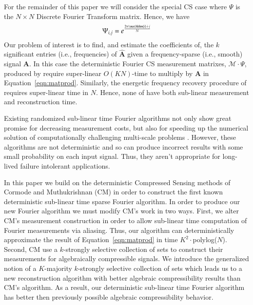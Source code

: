 \documentclass{article}
\begin{document}
For the remainder of this paper we will consider the special CS case where $\Psi$ is the $N \times N$ Discrete Fourier Transform matrix.  Hence, we have
\begin{equation}
\Psi_{i,j} = e^{\frac{2 \pi \mathbbm{i} \cdot i \cdot j}{N}}
\end{equation}
Our problem of interest is to find, and estimate the coefficients of, the $k$ significant entries (i.e., frequencies) of $\hat{\textbf{A}}$ given a frequency-sparse (i.e., smooth) signal \textbf{A}.  In this case the deterministic Fourier CS measurement matrixes, $\mathcal{M} \cdot \Psi$, produced by \cite{CS2,CMDetCS3,CMDetCS1,CMDetCS2} require super-linear $O(K N)$-time to multiply by \textbf{A} in Equation~\ref{eqn:matprod}.  Similarly, the energetic frequency recovery procedure of \cite{CS1,DetCS} requires super-linear time in $N$.  Hence, none of \cite{CS1,CS2,DetCS,CMDetCS3,CMDetCS1,CMDetCS2} have both sub-linear measurement and reconstruction time.  

Existing randomized sub-linear time Fourier algorithms \cite{AAFFT1,AAFFT1exp,AAFFT2} not only show great promise for decreasing measurement costs, but also for speeding up the numerical solution of computationally challenging multi-scale problems \cite{SparseSpect, SparseSpectM}.  However, these algorithms are not deterministic and so can produce incorrect results with some small probability on each input signal.  Thus, they aren't appropriate for long-lived failure intolerant applications.

In this paper we build on the deterministic Compressed Sensing methods of Cormode and Muthukrishnan (CM) \cite{CMDetCS3,CMDetCS1,CMDetCS2} in order to construct the first known deterministic sub-linear time sparse Fourier algorithm.  In order to produce our new Fourier algorithm we must modify CM's work in two ways.  First, we alter CM's measurement construction in order to allow sub-linear time computation of Fourier measurements via aliasing.  Thus, our algorithm can deterministically approximate the result of Equation~\ref{eqn:matprod} in time $K^{2} \cdot $polylog($N$).  Second, CM use a $k$-strongly selective collection of sets \cite{Constructions} to construct their measurements for algebraically compressible signals.  We introduce the generalized notion of a $K$-majority $k$-strongly selective collection of sets which leads us to a new reconstruction algorithm with better algebraic compressibility results than CM's algorithm.  As a result, our deterministic sub-linear time Fourier algorithm has better then previously possible algebraic compressibility behavior.
\end{document}
